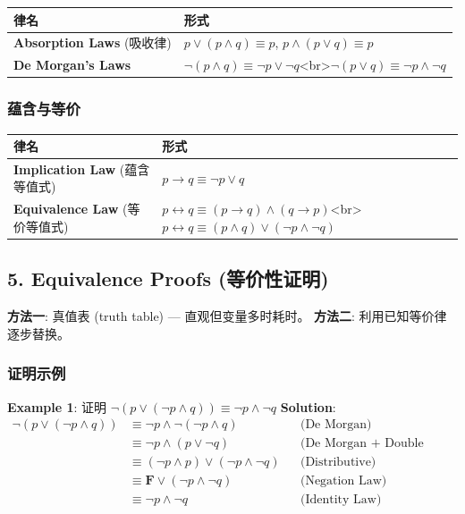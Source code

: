 \documentclass[10pt,a4paper,openany]{ctexbook}
\theoremstyle{definition}
\theoremstyle{remark}
\begin{document}
\begin{center}
\begin{tabular}{ll}
\hline
律名 & 形式 \\ \hline
\textbf{Absorption Laws} (吸收律) & $p \lor (p \land q) \equiv p$, $p \land (p \lor q) \equiv p$ \\
\textbf{De Morgan's Laws} & $\neg(p \land q) \equiv \neg p \lor \neg q$<br>$\neg(p \lor q) \equiv \neg p \land \neg q$ \\
\hline
\end{tabular}

\end{center}

\subsubsection{蕴含与等价}

\begin{center}
\begin{tabular}{ll}
\hline
律名 & 形式 \\ \hline
\textbf{Implication Law} (蕴含等值式) & $p \to q \equiv \neg p \lor q$ \\
\textbf{Equivalence Law} (等价等值式) & $p \leftrightarrow q \equiv (p \to q) \land (q \to p)$<br>$p \leftrightarrow q \equiv (p \land q) \lor (\neg p \land \neg q)$ \\
\hline
\end{tabular}

\end{center}

\vspace{-2pt}

\subsection{5. Equivalence Proofs (等价性证明)}

\textbf{方法一}: 真值表 (truth table) — 直观但变量多时耗时。
\textbf{方法二}: 利用已知等价律逐步替换。
\subsubsection{证明示例}

\textbf{Example 1}: 证明 $\neg(p \lor (\neg p \land q)) \equiv \neg p \land \neg q$
\textbf{Solution}:
\[
\begin{aligned}
\neg(p \lor (\neg p \land q)) &\equiv \neg p \land \neg(\neg p \land q) &&\text{(De Morgan)} \\
&\equiv \neg p \land (p \lor \neg q) &&\text{(De Morgan + Double Negation)} \\
&\equiv (\neg p \land p) \lor (\neg p \land \neg q) &&\text{(Distributive)} \\
&\equiv \mathbf{F} \lor (\neg p \land \neg q) &&\text{(Negation Law)} \\
&\equiv \neg p \land \neg q &&\text{(Identity Law)}
\end{aligned}
\]
\end{document}

